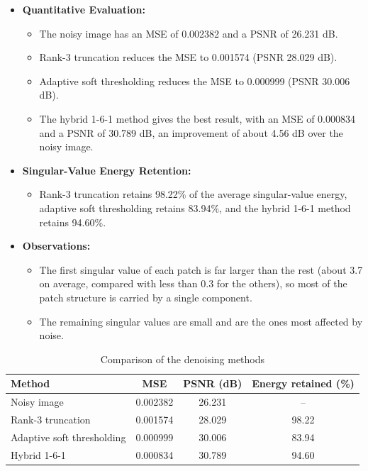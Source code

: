 \documentclass{article}
\begin{document}
\begin{flushleft}
\begin{itemize}
    \item \textbf{Quantitative Evaluation:}
    \begin{itemize}
        \item The noisy image has an MSE of 0.002382 and a PSNR of 26.231 dB.
        \item Rank-3 truncation reduces the MSE to 0.001574 (PSNR 28.029 dB).
        \item Adaptive soft thresholding reduces the MSE to 0.000999 (PSNR 30.006 dB).
        \item The hybrid 1-6-1 method gives the best result, with an MSE of 0.000834 and a PSNR of 30.789 dB, an improvement of about 4.56 dB over the noisy image.
    \end{itemize}
    \item \textbf{Singular-Value Energy Retention:}
    \begin{itemize}
        \item Rank-3 truncation retains 98.22\% of the average singular-value energy, adaptive soft thresholding retains 83.94\%, and the hybrid 1-6-1 method retains 94.60\%.
    \end{itemize}
    \item \textbf{Observations:}
    \begin{itemize}
        \item The first singular value of each patch is far larger than the rest (about 3.7 on average, compared with less than 0.3 for the others), so most of the patch structure is carried by a single component.
        \item The remaining singular values are small and are the ones most affected by noise.
    \end{itemize}
\end{itemize}

\begin{table}[h!]
    \centering
    \begin{tabular}{lccc}
        \toprule
        \textbf{Method} & \textbf{MSE} & \textbf{PSNR (dB)} & \textbf{Energy retained (\%)} \\
        \midrule
        Noisy image                & 0.002382 & 26.231 & --    \\
        Rank-3 truncation          & 0.001574 & 28.029 & 98.22 \\
        Adaptive soft thresholding & 0.000999 & 30.006 & 83.94 \\
        Hybrid 1-6-1               & 0.000834 & 30.789 & 94.60 \\
        \bottomrule
    \end{tabular}
    \caption{Comparison of the denoising methods}
    \label{tab:results}
\end{table}


\end{flushleft}
\end{document}
